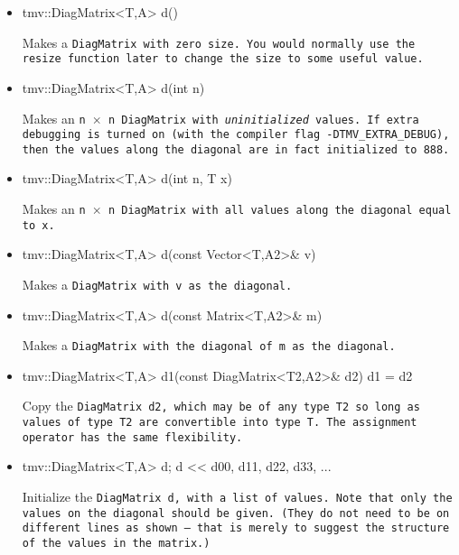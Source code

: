 \begin{itemize}

\item
\begin{tmvcode}
tmv::DiagMatrix<T,A> d()
\end{tmvcode}
Makes a \tt{DiagMatrix} with zero size.  You would normally use the \tt{resize} function later to
change the size to some useful value.

\item 
\begin{tmvcode}
tmv::DiagMatrix<T,A> d(int n)
\end{tmvcode}
Makes an \tt{n} $\times$ \tt{n} \tt{DiagMatrix} with {\em uninitialized} values.
If extra debugging is turned on (with the compiler flag \tt{-DTMV\_EXTRA\_DEBUG}), then the values along the diagonal are in fact initialized to 888. 

\item
\begin{tmvcode}
tmv::DiagMatrix<T,A> d(int n, T x)
\end{tmvcode}
Makes an \tt{n} $\times$ \tt{n} \tt{DiagMatrix} with all values along the diagonal equal to \tt{x}.

\item
\begin{tmvcode}
tmv::DiagMatrix<T,A> d(const Vector<T,A2>& v)
\end{tmvcode}
Makes a \tt{DiagMatrix} with \tt{v} as the diagonal.

\item 
\begin{tmvcode}
tmv::DiagMatrix<T,A> d(const Matrix<T,A2>& m)
\end{tmvcode}
Makes a \tt{DiagMatrix} with the diagonal of \tt{m} as the diagonal.

\item
\begin{tmvcode}
tmv::DiagMatrix<T,A> d1(const DiagMatrix<T2,A2>& d2)
d1 = d2
\end{tmvcode}
Copy the \tt{DiagMatrix d2}, which may be of any type \tt{T2} so long
as values of type \tt{T2} are convertible into type \tt{T}.
The assignment operator has the same flexibility.

\item
\begin{tmvcode}
tmv::DiagMatrix<T,A> d;
d << d00,
         d11,
             d22,
                 d33, 
                     ...
\end{tmvcode}
Initialize the \tt{DiagMatrix d}, with a list of values.  Note that only the values on the diagonal should be given.  (They do not need to be on different lines as shown -- that is merely to suggest the structure of the values in the matrix.)


\end{itemize}
